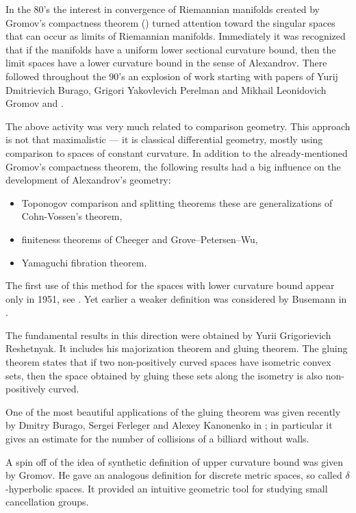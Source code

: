 In the 80's the interest in convergence of Riemannian manifolds created by Gromov's compactness theorem (\cite{gomov-precompactness}) turned attention toward the singular spaces that can occur as limits of Riemannian manifolds. 
Immediately it was recognized that if the manifolds have a uniform lower sectional curvature bound, then the limit spaces have a lower curvature bound in the sense of Alexandrov. 
There followed throughout the 90's an explosion of work starting with papers of Yurij Dmitrievich Burago, Grigori Yakovlevich Perelman and Mikhail Leonidovich Gromov  \cite{BGP} and \cite{perelman:spaces2}.

The above activity was very much related to comparison geometry.
This approach is not that maximalistic --- it is classical differential geometry, 
mostly using comparison  to spaces of constant curvature.
In addition to the already-mentioned Gromov's compactness theorem,
the following results had a big influence on the development of Alexandrov's geometry:
\begin{itemize}
\item Toponogov comparison and splitting theorems
these are generalizations of Cohn-Vossen's theorem,
\item finiteness theorems of
Cheeger and
Grove--Petersen--Wu,
\item Yamaguchi fibration theorem.
\end{itemize}

The first use of this method for the spaces with lower curvature bound appear only in 1951, see \cite{alexandrov:strong-angle}.
Yet earlier a weaker definition was considered by Busemann in \cite{busemann-CBA}.

The fundamental results in this direction were obtained by Yurii Grigorievich Reshetnyak.
It includes his majorization theorem and gluing theorem.
The gluing theorem states that if two non-positively curved spaces have isometric convex sets, then the space obtained by gluing these sets along the isometry is also non-positively curved.

One of the most beautiful applications of the gluing theorem was given  recently by Dmitry Burago, Sergei Ferleger and Alexey Kanonenko in \cite{BFK};
in particular it gives an estimate for the number of collisions of a billiard without walls.

A spin off of the idea of synthetic definition of upper curvature bound 
was given by Gromov. 
He gave an analogous definition for discrete metric spaces, so called $\delta$-hyperbolic spaces. 
It provided an intuitive geometric tool for studying small cancellation groups.

